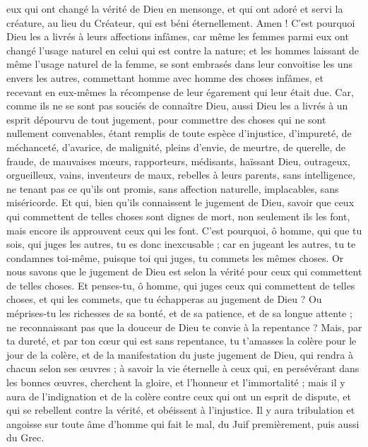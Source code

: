 \begin{multicols}{2}
eux qui ont changé la vérité de Dieu en mensonge, et qui ont adoré et servi la créature, au lieu du Créateur, qui est béni éternellement. Amen !
C'est pourquoi Dieu les a livrés à leurs affections infâmes, car même les femmes parmi eux ont changé l'usage naturel en celui qui est contre la nature;
et les hommes laissant de même l'usage naturel de la femme, se sont embrasés dans leur convoitise les uns envers les autres, commettant homme avec homme des choses infâmes, et recevant en eux-mêmes la récompense de leur égarement qui leur était due.
Car, comme ils ne se sont pas souciés de connaître Dieu, aussi Dieu les a livrés à un esprit dépourvu de tout jugement, pour commettre des choses qui ne sont nullement convenables,
étant remplis de toute espèce d'injustice, d'impureté, de méchanceté, d'avarice, de malignité, pleins d'envie, de meurtre, de querelle, de fraude, de mauvaises mœurs,
rapporteurs, médisants, haïssant Dieu, outrageux, orgueilleux, vains, inventeurs de maux, rebelles à leurs parents,
sans intelligence, ne tenant pas ce qu'ils ont promis, sans affection naturelle, implacables, sans miséricorde.
Et qui, bien qu'ils connaissent le jugement de Dieu, savoir que ceux qui commettent de telles choses sont dignes de mort, non seulement ils les font, mais encore ils approuvent ceux qui les font.
\VerseOne{}C'est pourquoi, ô homme, qui que tu sois, qui juges les autres, tu es donc inexcusable ; car en jugeant les autres, tu te condamnes toi-même, puisque toi qui juges, tu commets les mêmes choses.
Or nous savons que le jugement de Dieu est selon la vérité pour ceux qui commettent de telles choses.
Et penses-tu, ô homme, qui juges ceux qui commettent de telles choses, et qui les commets, que tu échapperas au jugement de Dieu ?
Ou méprises-tu les richesses de sa bonté, et de sa patience, et de sa longue attente ; ne reconnaissant pas que la douceur de Dieu te convie à la repentance ?
Mais, par ta dureté, et par ton cœur qui est sans repentance, tu t'amasses la colère pour le jour de la colère, et de la manifestation du juste jugement de Dieu,
qui rendra à chacun selon ses œuvres ;
à savoir la vie éternelle à ceux qui, en persévérant dans les bonnes œuvres, cherchent la gloire, et l'honneur et l'immortalité ;
mais il y aura de l'indignation et de la colère contre ceux qui ont un esprit de dispute, et qui se rebellent contre la vérité, et obéissent à l'injustice.
Il y aura tribulation et angoisse sur toute âme d'homme qui fait le mal, du Juif premièrement, puis aussi du Grec.

\end{multicols}

